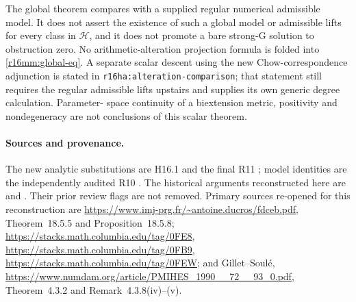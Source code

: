 The global theorem compares with a supplied regular numerical
admissible model. It does not assert the existence of such a
global model or admissible lifts for every class in $\mathcal H$,
and it does not promote a bare strong-G solution to obstruction
zero. No arithmetic-alteration projection formula is folded into
\eqref{r16mm:global-eq}. A separate scalar descent using the new
Chow-correspondence adjunction is stated in
\texttt{r16ha:alteration-comparison}; that statement still requires
the regular admissible lifts upstairs and supplies its own generic
degree calculation. Parameter-
space continuity of a biextension metric, positivity and
nondegeneracy are not conclusions of this scalar theorem.

\paragraph{Sources and provenance.}
The new analytic substitutions are H16.1 and the final R11
; model
identities are the independently audited R10
.
The historical arguments reconstructed here are
and
.
Their prior review flags are not removed.
Primary sources re-opened for this reconstruction are
\url{https://www.imj-prg.fr/~antoine.ducros/fdceb.pdf},
Theorem~18.5.5 and Proposition~18.5.8;
\url{https://stacks.math.columbia.edu/tag/0FE8},
\url{https://stacks.math.columbia.edu/tag/0FB9},
\url{https://stacks.math.columbia.edu/tag/0FEW}; and
Gillet--Soul\'e,
\url{https://www.numdam.org/article/PMIHES_1990__72__93_0.pdf},
Theorem~4.3.2 and Remark~4.3.8(iv)--(v).
